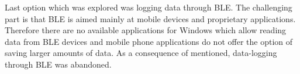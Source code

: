 Last option which was explored was logging data through BLE. The challenging part is that BLE is aimed mainly at mobile devices and proprietary applications. Therefore there are no available applications for Windows which allow reading data from BLE devices and mobile phone applications do not offer the option of saving larger amounts of data. As a consequence of mentioned, data-logging through BLE was abandoned.